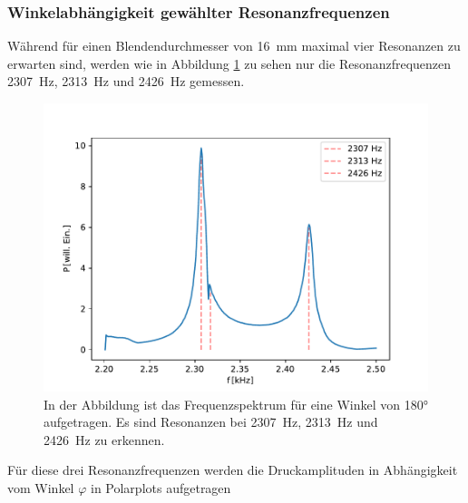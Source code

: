         \subsubsection*{Winkelabhängigkeit gewählter Resonanzfrequenzen}
            Während für einen Blendendurchmesser von \SI{16}{\milli\metre} maximal vier Resonanzen zu erwarten sind, werden wie in Abbildung \ref{fig:hmol_res} zu sehen nur die Resonanzfrequenzen 
            \SI{2307}{\hertz}, \SI{2313}{\hertz} und \SI{2426}{\hertz} gemessen.  
            \begin{figure}[ht]
                \centering
                \includegraphics[scale=0.5]{./pictures/hmol_res.pdf}
                \caption{In der Abbildung ist das Frequenzspektrum für eine Winkel von 180° aufgetragen. Es sind Resonanzen bei \SI{2307}{\hertz}, \SI{2313}{\hertz} und \SI{2426}{\hertz} zu erkennen.}
                \label{fig:hmol_res}
            \end{figure}
            \FloatBarrier
            Für diese drei Resonanzfrequenzen werden die Druckamplituden in Abhängigkeit vom Winkel $\varphi$ in Polarplots aufgetragen 

